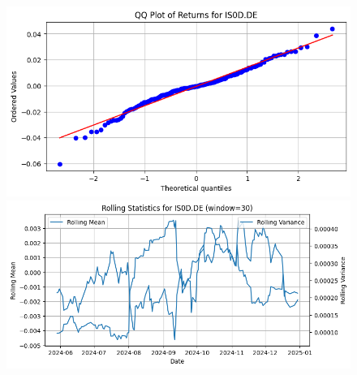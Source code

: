 \documentclass{article}%
\begin{document}
%


\begin{figure}[htbp]%
\begin{minipage}{0.31\textwidth}%
\includegraphics[width=\linewidth]{ticker_images/IS0D.DE_qq_plot.png}%
\end{minipage}%
\begin{minipage}{0.31\textwidth}%
\includegraphics[width=\linewidth]{ticker_images/IS0D.DE_rolling_stats.png}%
\end{minipage}%
\end{figure}

%
\end{document}
